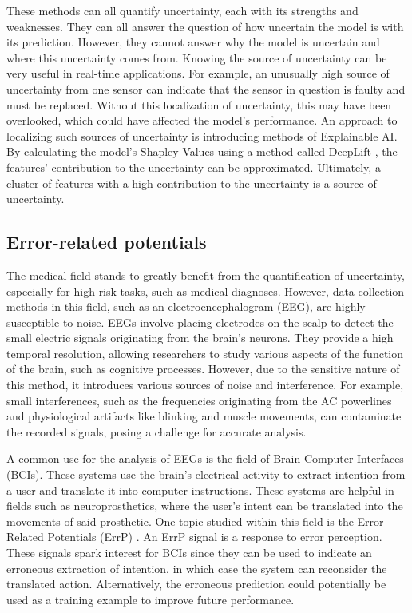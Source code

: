 These methods can all quantify uncertainty, each with its strengths and weaknesses. They can all answer the question of how uncertain the model is with its prediction. However, they cannot answer why the model is uncertain and where this uncertainty comes from. Knowing the source of uncertainty can be very useful in real-time applications. For example, an unusually high source of uncertainty from one sensor can indicate that the sensor in question is faulty and must be replaced. Without this localization of uncertainty, this may have been overlooked, which could have affected the model's performance. An approach to localizing such sources of uncertainty is introducing methods of Explainable AI. By calculating the model's Shapley Values using a method called DeepLift \citep{shrikumar2017learning}, the features' contribution to the uncertainty can be approximated. Ultimately, a cluster of features with a high contribution to the uncertainty is a source of uncertainty. 

\subsection{Error-related potentials}

The medical field stands to greatly benefit from the quantification of uncertainty, especially for high-risk tasks, such as medical diagnoses.  However, data collection methods in this field, such as an electroencephalogram (EEG), are highly susceptible to noise. EEGs involve placing electrodes on the scalp to detect the small electric signals originating from the brain's neurons. They provide a high temporal resolution, allowing researchers to study various aspects of the function of the brain, such as cognitive processes. However, due to the sensitive nature of this method, it introduces various sources of noise and interference. For example, small interferences, such as the frequencies originating from the AC powerlines and physiological artifacts like blinking and muscle movements, can contaminate the recorded signals, posing a challenge for accurate analysis.

A common use for the analysis of EEGs is the field of Brain-Computer Interfaces (BCIs). These systems use the brain's electrical activity to extract intention from a user and translate it into computer instructions. These systems are helpful in fields such as neuroprosthetics, where the user's intent can be translated into the movements of said prosthetic. One topic studied within this field is the Error-Related Potentials (ErrP) \citep{chavarriaga2010learning}. An ErrP signal is a response to error perception. These signals spark interest for BCIs since they can be used to indicate an erroneous extraction of intention, in which case the system can reconsider the translated action. Alternatively, the erroneous prediction could potentially be used as a training example to improve future performance. 

